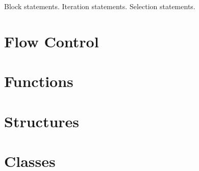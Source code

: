 \pending{}Block statements. Iteration statements. Selection statements.

\section{Flow Control}
\section{Functions}
\section{Structures}
\section{Classes}


